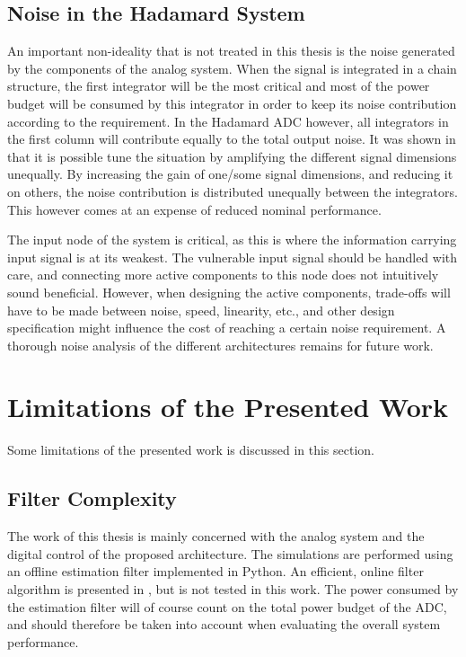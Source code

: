 \subsection{Noise in the Hadamard System}
An important non-ideality that is not treated in this thesis is the noise generated by the components of the analog system. When the signal is integrated in a chain structure, the first integrator will be the most critical and most of the power budget will be consumed by this integrator in order to keep its noise contribution according to the requirement. In the Hadamard ADC however, all integrators in the first column will contribute equally to the total output noise. It was shown in \cite{malmberg_thesis} that it is possible tune the situation by amplifying the different signal dimensions unequally. By increasing the gain of one/some signal dimensions, and reducing it on others, the noise contribution is distributed unequally between the integrators. This however comes at an expense of reduced nominal performance.

The input node of the system is critical, as this is where the information carrying input signal is at its weakest. The vulnerable input signal should be handled with care, and connecting more active components to this node does not intuitively sound beneficial. However, when designing the active components, trade-offs will have to be made between noise, speed, linearity, etc., and other design specification might influence the cost of reaching a certain noise requirement. A thorough noise analysis of the different architectures remains for future work.
















\section{Limitations of the Presented Work}
Some limitations of the presented work is discussed in this section.


\subsection{Filter Complexity}
The work of this thesis is mainly concerned with the analog system and the digital control of the proposed architecture. The simulations are performed using an offline estimation filter implemented in Python. An efficient, online filter algorithm is presented in \cite{malmberg_thesis}, but is not tested in this work. The power consumed by the estimation filter will of course count on the total power budget of the ADC, and should therefore be taken into account when evaluating the overall system performance.

